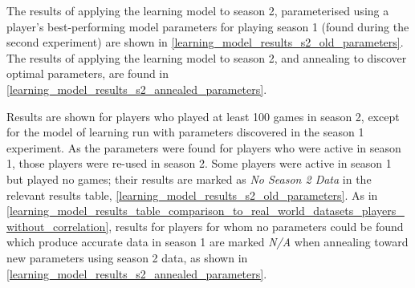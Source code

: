 The results of applying the learning
model to season 2, parameterised using a player's best-performing model
parameters for playing season 1 (found during the second experiment) are shown
in \cref{learning_model_results_s2_old_parameters}. The results of applying the
learning model to season 2, and annealing to discover optimal parameters, are
found in \cref{learning_model_results_s2_annealed_parameters}.

Results are shown for players who played at least 100 games in season 2, except
for the model of learning run with parameters discovered in the season 1
experiment. As the parameters were found for players who were active in season
1, those players were re-used in season 2. Some players were active in season 1
but played no games; their results are marked as \emph{No Season 2 Data} in the relevant
results table, \cref{learning_model_results_s2_old_parameters}. As in
\cref{learning_model_results_table_comparison_to_real_world_datasets_players_without_correlation},
results for players for whom no parameters could be found which produce accurate data in
season 1 are marked \emph{N/A} when annealing toward new parameters using season
2 data, as shown in \cref{learning_model_results_s2_annealed_parameters}.



